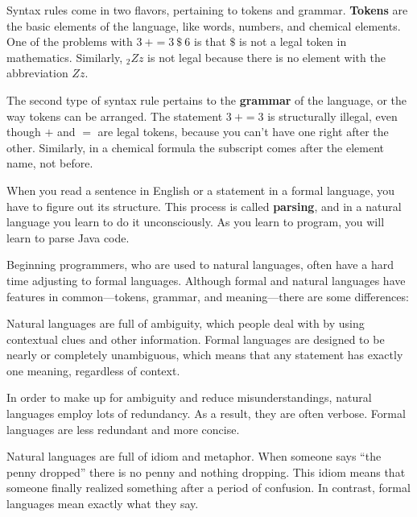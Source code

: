 \documentclass[12pt]{book}
\makeatletter
\newcommand{\term}[1]{%
\index{#1}
\item[#1:]}
\theoremstyle{exercise}
\renewcommand\subsection{\@startsection{subsection}{2}{\z@}%
    {-3.25ex\@plus -1ex \@minus -.2ex}%
    {0.3ex \@plus .2ex}%
    {\normalfont\large\bfseries}}
\makeatother
\begin{document}
Syntax rules come in two flavors, pertaining to tokens and grammar.
{\bf Tokens} are the basic elements of the language, like words, numbers, and chemical elements.
One of the problems with $3\ + = 3\ \$\ 6$ is that $\$$ is not a legal token in mathematics.
Similarly, $_2Zz$ is not legal because there is no element with the abbreviation $Zz$.


The second type of syntax rule pertains to the {\bf grammar} of the language, or the way tokens can be arranged.
The statement $3\ + = 3$ is structurally illegal, even though $+$ and $=$ are legal tokens, because you can't have one right after the other.
Similarly, in a chemical formula the subscript comes after the element name, not before.


When you read a sentence in English or a statement in a formal language, you have to figure out its structure.
This process is called {\bf parsing}, and in a natural language you learn to do it unconsciously.
As you learn to program, you will learn to parse Java code.




Beginning programmers, who are used to natural languages, often have a hard time adjusting to formal languages.
Although formal and natural languages have features in common---tokens, grammar, and meaning---there are some differences:

\begin{description}

\term{ambiguity}
Natural languages are full of ambiguity, which people deal with by using contextual clues and other information.
Formal languages are designed to be nearly or completely unambiguous, which means that any statement has exactly one meaning, regardless of context.

\term{redundancy}
In order to make up for ambiguity and reduce misunderstandings, natural languages employ lots of redundancy.
As a result, they are often verbose.
Formal languages are less redundant and more concise.

\term{literalness}
Natural languages are full of idiom and metaphor.
When someone says ``the penny dropped'' there is no penny and nothing dropping.
This idiom means that someone finally realized something after a period of confusion.
In contrast, formal languages mean exactly what they say.

\end{description}
\end{document}
